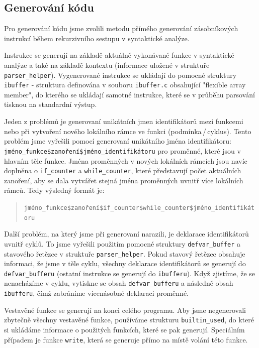 \documentclass[11pt]{article}
\begin{document}
\subsection{Generování kódu}
Pro generování kódu jsme zvolili metodu přímého generování zásobníkových instrukcí během rekurzivního sestupu v syntaktické analýze.

Instrukce se generují na základě aktuálně vykonávané funkce v syntaktické analýze a také na základě kontextu (informace uložené v struktuře
\texttt{parser\_helper}). Vygenerované instrukce se ukládají do pomocné struktury \texttt{ibuffer} - struktura definována v souboru \texttt{ibuffer.c}
obsahující "flexible array member", do kterého se ukládají samotné instrukce, které se v průběhu parsování tisknou na standardní výstup.

Jeden z problémů je generovaní unikátních jmen identifikátorů mezi funkcemi nebo při vytvoření nového lokálního rámce ve funkci (podmínka\,/\,cyklus).
Tento problém jsme vyřešili pomocí generovaní unikátního jména identifikátoru: \texttt{jméno\_funkce\$zanoření\$jméno\_identifikátoru} pro proměnné,
které jsou v hlavním těle funkce. Jména proměnných v nových lokálních rámcích jsou navíc doplněna o \texttt{if\_counter} a \texttt{while\_counter},
které představují počet aktuálních zanoření, aby se dala vytvářet stejná jména proměnných uvnitř více lokálních rámců. Tedy výsledný formát je:

\begin{quotation}
    \texttt{jméno\_funkce\$zanoření\$if\_counter\$while\_counter\$jméno\_identifikátoru}
\end{quotation}

Další problém, na který jsme při generovaní narazili, je deklarace identifikátorů uvnitř cyklů. To jsme vyřešili použitím pomocné struktury
\texttt{defvar\_buffer} a stavového řetězce v struktuře \texttt{parser\_helper}. Pokud stavový řetězec obsahuje informaci, že jsme v těle cyklu,
všechny deklarace identifikátorů se generují do \texttt{defvar\_bufferu} (ostatní instrukce se generují do \texttt{ibufferu}). Když zjistíme,
že se nenacházíme v cyklu, vytiskne se obsah \texttt{defvar\_bufferu} a následně obsah \texttt{ibufferu}, čímž zabráníme vícenásobné deklaraci proměnné.

Vestavěné funkce se generují na konci celého programu. Aby jsme negenerovali zbytečně všechny vestavěné funkce, používáme strukturu \texttt{builtin\_used},
do které si ukládáme informace o použitých funkcích, které se pak generují. Speciálním případem je funkce \texttt{write}, která se generuje přímo na místě volání této funkce.
\end{document}
